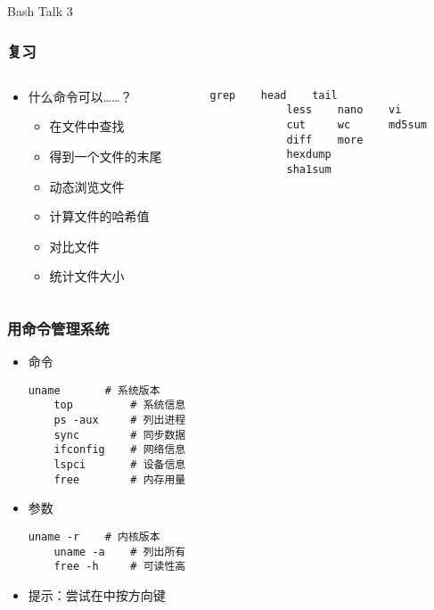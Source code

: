 


\begin{CJK}{UTF8}{gbsn}

\PreFirstFrame
\begin{frame} [fragile]
	\centerline{\fontsize{42}{42}\selectfont Bash Talk 3}
\end{frame}
\PostFirstFrame

\begin{frame} [fragile]
	\frametitle{复习}
	\linespread{1.5}
	\begin{columns}[T]
		\begin{column}[T]{.5\textwidth}
			\begin{itemize}
			\item 什么命令可以……？
				\begin{itemize}
				\item 在文件中查找
				\item 得到一个文件的末尾
				\item 动态浏览文件
				\item 计算文件的哈希值
				\item 对比文件
				\item 统计文件大小
				\end{itemize}
			\end{itemize}
		\end{column}
		\begin{column}[T]{.5\textwidth}
			\begin{lstlisting}[style=bashstyle, gobble=12, texcl]
			grep	head	tail
			less	nano	vi
			cut		wc		md5sum
			diff	more
			hexdump
			sha1sum
			\end{lstlisting}
		\end{column}
	\end{columns}
\end{frame}

\begin{frame} [fragile]
	\frametitle{用命令管理系统}
	\linespread{1.25}
	\begin{itemize}
	\item 命令
	\begin{lstlisting}[style=bashstyle, gobble=4, texcl]
	uname		# 系统版本
	top			# 系统信息
	ps -aux		# 列出进程
	sync		# 同步数据
	ifconfig	# 网络信息
	lspci		# 设备信息
	free		# 内存用量
	\end{lstlisting}
	\item 参数
	\begin{lstlisting}[style=bashstyle, gobble=4, texcl]
	uname -r	# 内核版本
	uname -a	# 列出所有
	free -h		# 可读性高
	\end{lstlisting}
	\item 提示：尝试在中按方向键
	\end{itemize}
\end{frame}


\end{CJK}

